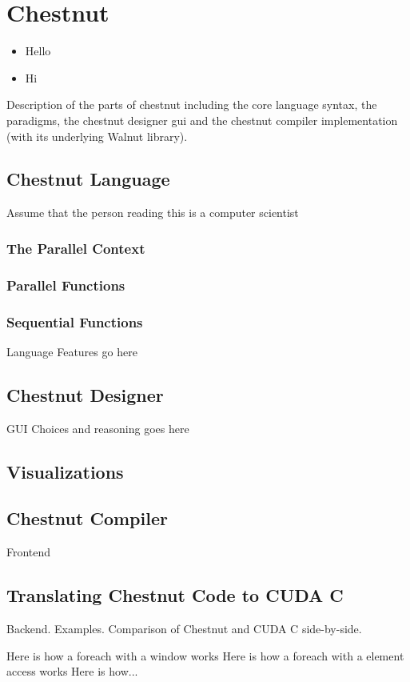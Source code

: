 \section{Chestnut}

\begin{itemize}
\item Hello
\item Hi
\end{itemize}


Description of the parts of chestnut including the core language syntax, the paradigms, the chestnut designer gui and the chestnut compiler implementation (with its underlying Walnut library).

\subsection{Chestnut Language}
Assume that the person reading this is a computer scientist

\subsubsection{The Parallel Context}
\subsubsection{Parallel Functions}
\subsubsection{Sequential Functions}
Language Features go here

\subsection{Chestnut Designer}

GUI Choices and reasoning goes here

\subsection{Visualizations}

\subsection{Chestnut Compiler}

Frontend

\subsection{Translating Chestnut Code to CUDA C}

Backend. Examples. Comparison of Chestnut and CUDA C side-by-side.

Here is how a foreach with a window works
Here is how a foreach with a element access works
Here is how...

   

